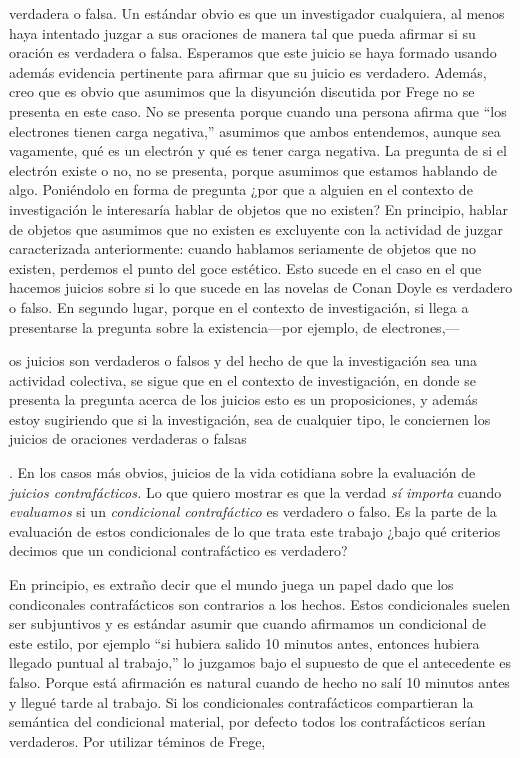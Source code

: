{verdadera o falsa. Un estándar obvio es que un investigador cualquiera, al menos haya intentado juzgar a sus oraciones de manera tal que pueda afirmar si su oración es verdadera o falsa. Esperamos que este juicio se haya formado usando además evidencia pertinente para afirmar que su juicio es verdadero. Además, creo que es obvio que asumimos que la disyunción discutida por Frege no se presenta en este caso. No se presenta porque cuando una persona afirma que ``los electrones tienen carga negativa,'' asumimos que ambos entendemos, aunque sea vagamente, qué es un electrón y qué es tener carga negativa. La pregunta de si el electrón existe o no, no se presenta, porque asumimos que estamos hablando de algo. Poniéndolo en forma de pregunta ¿por que a alguien en el contexto de investigación le interesaría hablar de objetos que no existen? En principio, hablar de objetos que asumimos que no existen es excluyente con la actividad de juzgar caracterizada anteriormente: cuando hablamos seriamente de objetos que no existen, perdemos el punto del goce estético. Esto sucede en el caso en el que hacemos juicios sobre si lo que sucede en las novelas de Conan Doyle es verdadero o falso. En segundo lugar, porque en el contexto de investigación, si llega a presentarse la pregunta sobre la existencia---por ejemplo, de electrones,--- 


os juicios son verdaderos o falsos y del hecho de que la
investigación sea una actividad colectiva, se sigue que en el contexto de
investigación, en donde se presenta la pregunta acerca de los juicios esto es un
proposiciones, y además estoy sugiriendo que si la investigación, sea de cualquier
tipo, le conciernen los juicios de oraciones verdaderas o falsas }. En los casos más
obvios, juicios de la vida cotidiana sobre la evaluación de \textit{juicios
contrafácticos.} Lo que quiero mostrar es que la verdad \textit{sí importa} cuando
\textit{evaluamos} si un \textit{condicional contrafáctico} es verdadero o falso. Es
la parte de la evaluación de estos condicionales de lo que trata este trabajo ¿bajo
qué criterios decimos que un condicional contrafáctico es verdadero? 

En principio, es extraño decir que el mundo juega un papel dado que los condiconales
contrafácticos son contrarios a los hechos. Estos condicionales suelen ser
subjuntivos y es estándar asumir que cuando afirmamos un condicional de este estilo,
por ejemplo ``si hubiera salido 10 minutos antes, entonces hubiera llegado puntual al
trabajo,'' lo juzgamos bajo el supuesto de que el antecedente es falso. Porque está afirmación es natural cuando de hecho no salí 10 minutos antes y llegué tarde al trabajo. Si los condicionales contrafácticos compartieran la semántica del condicional material, por defecto todos los contrafácticos serían verdaderos. Por utilizar
téminos de Frege, 

